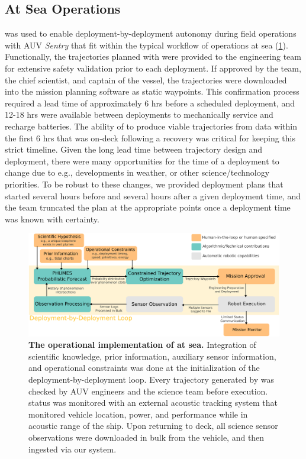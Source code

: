 \subsection{At Sea Operations}
\PHORTEX was used to enable deployment-by-deployment autonomy during field operations with AUV \emph{Sentry} that fit within the typical workflow of operations at sea (\cref{fig:at_sea_ops}). Functionally, the trajectories planned with \PHORTEX were provided to the \Sentry engineering team for extensive safety validation prior to each deployment. If approved by the \Sentry team, the chief scientist, and captain of the vessel, the trajectories were downloaded into the \Sentry mission planning software as static waypoints. This confirmation process required a lead time of approximately 6 hrs before a scheduled deployment, and 12-18 hrs were available between deployments to mechanically service \Sentry and recharge batteries. The ability of \PHORTEX to produce viable trajectories from data within the first 6 hrs that \Sentry was on-deck following a recovery was critical for keeping this strict timeline. Given the long lead time between trajectory design and \Sentry deployment, there were many opportunities for the time of a deployment to change due to e.g., developments in weather, or other science/technology priorities. To be robust to these changes, we provided deployment plans that started several hours before and several hours after a given deployment time, and the \Sentry team truncated the plan at the appropriate points once a deployment time was known with certainty.

\begin{figure}[h!]
    \centering
    \includegraphics[width=0.9\columnwidth]{figures/deployment_loop.png}
    \caption{\textbf{The operational implementation of \PHORTEX at sea.} Integration of scientific knowledge, prior information, auxiliary sensor information, and operational constraints was done at the initialization of the \PHORTEX deployment-by-deployment loop. Every trajectory generated by \PHORTEX was checked by AUV \Sentry engineers and the science team before execution. \Sentry status was monitored with an external acoustic tracking system that monitored vehicle location, power, and performance while in acoustic range of the ship. Upon returning to deck, all science sensor observations were downloaded in bulk from the vehicle, and then ingested via our \PHORTEX system.}
    \label{fig:at_sea_ops}
\end{figure}

